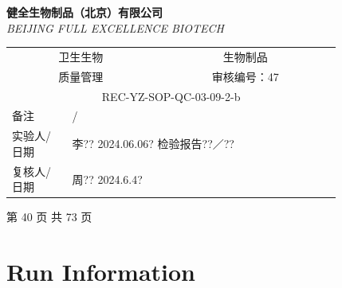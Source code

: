 \documentclass[UTF8,10pt,a4paper,fontset=fandol]{ctexart}
\newcommand{\fieldvalue}[1]{#1}
\newcommand{\handwritten}[1]{#1}
\begin{document}
\newpage

\begin{center}
\begin{minipage}{0.92\linewidth}
\small
\noindent
\textbf{健全生物制品（北京）有限公司}\\
\textit{BEIJING FULL EXCELLENCE BIOTECH}

\vspace{0.2em}

\begin{tabular}{|p{0.15\linewidth}|p{0.22\linewidth}|p{0.20\linewidth}|p{0.25\linewidth}|}
\hline
\multicolumn{2}{c|}{卫生生物} &
\multicolumn{2}{c|}{生物制品} \\
\multicolumn{2}{c|}{质量管理} &
\multicolumn{2}{c|}{审核编号：47} \\
\hline
\multicolumn{4}{c}{REC-YZ-SOP-QC-03-09-2-b} \\
\hline
备注 &
\multicolumn{3}{l|}{%
\handwritten{/}} \\
\hline
实验人/日期 &
\multicolumn{3}{l|}{%
\fieldvalue{\handwritten{李??}}%
\quad
\fieldvalue{\handwritten{2024.06.06?}}%
\quad
\handwritten{检验报告??／??}} \\
\hline
复核人/日期 &
\multicolumn{3}{l|}{%
\fieldvalue{\handwritten{周??}}%
\quad
\fieldvalue{\handwritten{2024.6.4?}}} \\
\hline
\end{tabular}
\end{minipage}
\end{center}

\vfill

\begin{center}
第 40 页 共 73 页
\end{center}

\newpage

\section{Run Information}
\end{document}
